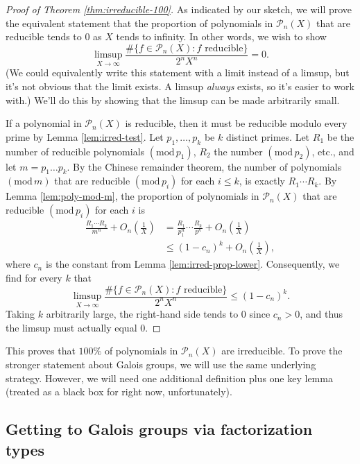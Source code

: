 \documentclass[12pt]{amsart}
\theoremstyle{definition} \newtheorem*{notation}{Notation}
\theoremstyle{remark} \newtheorem*{remark}{Remark}
\theoremstyle{remark} \newtheorem*{example}{Example}
\theoremstyle{definition} \newtheorem*{definition}{Definition}
\numberwithin{equation}{section}
\numberwithin{theorem}{section}
\renewcommand{\pmod}[1]{\left(\mathrm{mod}\,#1\right)}
\begin{document}
	\begin{proof}[Proof of Theorem \ref{thm:irreducible-100}]
		As indicated by our sketch, we will prove the equivalent statement that the proportion of polynomials in $\mathcal{P}_n(X)$ that are reducible tends to $0$ as $X$ tends to infinity.  In other words, we wish to show
			\[
				\limsup_{X \to \infty} \frac{\#\{f \in \mathcal{P}_n(X) : f \text{ reducible}\}}{2^nX^n} = 0.
			\]
		(We could equivalently write this statement with a limit instead of a limsup, but it's not obvious that the limit exists.  A limsup \emph{always} exists, so it's easier to work with.)  We'll do this by showing that the limsup can be made arbitrarily small.
		
		If a polynomial in $\mathcal{P}_n(X)$ is reducible, then it must be reducible modulo every prime by Lemma \ref{lem:irred-test}.  Let $p_1,\dots,p_k$ be $k$ distinct primes.  Let $R_1$ be the number of reducible polynomials $\pmod{p_1}$, $R_2$ the number $\pmod{p_2}$, etc., and let $m = p_1 \dots p_k$.  By the Chinese remainder theorem, the number of polynomials $\pmod{m}$ that are reducible $\pmod{p_i}$ for each $i \leq k$, is exactly $R_1 \cdots R_k$.  By Lemma \ref{lem:poly-mod-m}, the proportion of polynomials in $\mathcal{P}_n(X)$ that are reducible $\pmod{p_i}$ for each $i$ is 
			\begin{align*}
				\frac{R_1\cdots R_k}{m^n} + O_n\left(\frac{1}{X}\right)
					&= \frac{R_1}{p_1^n} \cdots \frac{R_k}{p^k} + O_n\left(\frac{1}{X}\right) \\
					&\leq (1 - c_n)^k + O_n\left(\frac{1}{X}\right),
			\end{align*}
		where $c_n$ is the constant from Lemma \ref{lem:irred-prop-lower}.  Consequently, we find for every $k$ that
			\[
				\limsup_{X \to \infty} \frac{\#\{f \in \mathcal{P}_n(X) : f \text{ reducible}\}}{2^nX^n}
					\leq (1-c_n)^k.
			\]
		Taking $k$ arbitrarily large, the right-hand side tends to $0$ since $c_n>0$, and thus the limsup must actually equal $0$.
	\end{proof}
	
	This proves that $100\%$ of polynomials in $\mathcal{P}_n(X)$ are irreducible.  To prove the stronger statement about Galois groups, we will use the same underlying strategy.  However, we will need one additional definition plus one key lemma (treated as a black box for right now, unfortunately).
	
	\subsection{Getting to Galois groups via factorization types}
	
\end{document}
